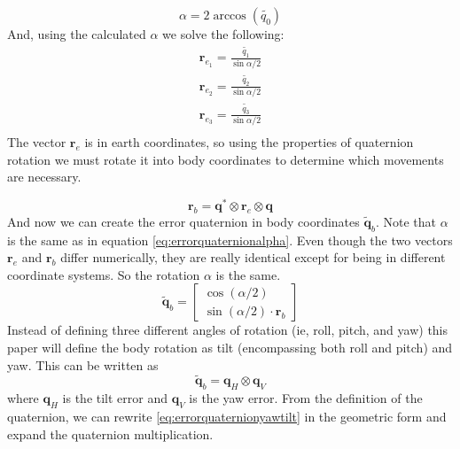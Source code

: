 \documentclass{article}
\numberwithin{equation}{section} %
\newcommand{\bs}[1]{\boldsymbol{#1}}
\begin{document}
\begin{equation} \label{eq:errorquaternionalpha}
\alpha = 2\arccos{\left(\tilde{q_0}\right)}
\end{equation}
And, using the calculated $\alpha$ we solve the following:
\begin{eqnarray}
\bs{r}_{e_1} = \frac{\tilde{q_1}}{\sin{\alpha/2}} \\
\bs{r}_{e_2} = \frac{\tilde{q_2}}{\sin{\alpha/2}} \\
\bs{r}_{e_3} = \frac{\tilde{q_3}}{\sin{\alpha/2}} \\
\end{eqnarray}
The vector $\bs{r}_e$ is in earth coordinates, so using the properties of quaternion rotation we must rotate it into body coordinates to determine which movements are necessary.


\begin{equation} 
\bs{r}_b = \bs{q}^* \otimes \bs{r}_e \otimes \bs{q}
\end{equation}
And now we can create the error quaternion in body coordinates $\tilde{\bs{q}}_b$. Note that $\alpha$ is the same as in equation \eqref{eq:errorquaternionalpha}. Even though the two vectors $\bs{r}_e$ and $\bs{r}_b$ differ numerically, they are really identical except for being in different coordinate systems. So the rotation $\alpha$ is the same.
\begin{equation} \label{eq:qberror}
\tilde{\bs{q}}_b = 
\begin{bmatrix}
	\cos \left( \alpha / 2 \right) \\
	\sin \left( \alpha / 2 \right) \cdot \bs{r}_b
\end{bmatrix}
\end{equation}
Instead of defining three different angles of rotation (ie, roll, pitch, and yaw) this paper will define the body rotation as tilt (encompassing both roll and pitch) and yaw. This can be written as
\begin{equation} \label{eq:errorquaternionyawtilt}
\tilde{\bs{q}}_b = \bs{q}_H \otimes \bs{q}_V
\end{equation}
where $\bs{q}_H$ is the tilt error and $\bs{q}_V$ is the yaw error. From the definition of the quaternion, we can rewrite \eqref{eq:errorquaternionyawtilt} in the geometric form and expand the quaternion multiplication.
\end{document}
